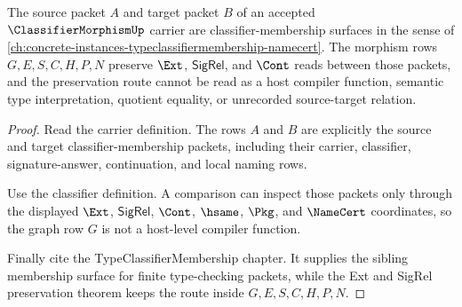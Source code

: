\begin{theorem}
\label{thm:classifier-morphism-type-membership-dependency}
The source packet $A$ and target packet $B$ of an accepted $\ClassifierMorphismUp$ carrier are classifier-membership surfaces in the sense of \autoref{ch:concrete-instances-typeclassifiermembership-namecert}. The morphism rows $G,E,S,C,H,P,N$ preserve $\Ext$, $\mathsf{SigRel}$, and $\Cont$ reads between those packets, and the preservation route cannot be read as a host compiler function, semantic type interpretation, quotient equality, or unrecorded source-target relation.
\end{theorem}
\begin{proof}
Read the carrier definition. The rows $A$ and $B$ are explicitly the source and target classifier-membership packets, including their carrier, classifier, signature-answer, continuation, and local naming rows.

Use the classifier definition. A comparison can inspect those packets only through the displayed $\Ext$, $\mathsf{SigRel}$, $\Cont$, $\hsame$, $\Pkg$, and $\NameCert$ coordinates, so the graph row $G$ is not a host-level compiler function.

Finally cite the TypeClassifierMembership chapter. It supplies the sibling membership surface for finite type-checking packets, while the Ext and SigRel preservation theorem keeps the route inside $G,E,S,C,H,P,N$.
\end{proof}

